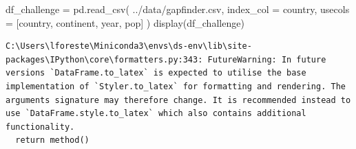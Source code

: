 \documentclass[
  letterpaper,
  DIV=11,
  numbers=noendperiod]{scrreprt}
\newenvironment{Shaded}{\begin{snugshade}}{\end{snugshade}}
\newcommand{\NormalTok}[1]{\textcolor[rgb]{0.00,0.23,0.31}{#1}}
\newcommand{\OperatorTok}[1]{\textcolor[rgb]{0.37,0.37,0.37}{#1}}
\newcommand{\StringTok}[1]{\textcolor[rgb]{0.13,0.47,0.30}{#1}}
\begin{document}
\begin{tcolorbox}[enhanced jigsaw, rightrule=.15mm, opacitybacktitle=0.6, colback=white, toprule=.15mm, colframe=quarto-callout-note-color-frame, bottomtitle=1mm, bottomrule=.15mm, arc=.35mm, coltitle=black, breakable, title={Solution to Challenge 1}, titlerule=0mm, opacityback=0, colbacktitle=quarto-callout-note-color!10!white, left=2mm, toptitle=1mm, leftrule=.75mm]

\begin{Shaded}
\begin{Highlighting}[]
\NormalTok{df\_challenge }\OperatorTok{=}\NormalTok{ pd.read\_csv(}
    \StringTok{\textquotesingle{}../data/gapfinder.csv\textquotesingle{}}\NormalTok{,}
\NormalTok{    index\_col }\OperatorTok{=} \StringTok{\textquotesingle{}country\textquotesingle{}}\NormalTok{,}
\NormalTok{    usecols }\OperatorTok{=}\NormalTok{ [}\StringTok{\textquotesingle{}country\textquotesingle{}}\NormalTok{, }\StringTok{\textquotesingle{}continent\textquotesingle{}}\NormalTok{, }\StringTok{\textquotesingle{}year\textquotesingle{}}\NormalTok{, }\StringTok{\textquotesingle{}pop\textquotesingle{}}\NormalTok{]}
\NormalTok{)}
\NormalTok{display(df\_challenge)}
\end{Highlighting}
\end{Shaded}

\begin{verbatim}
C:\Users\lforeste\Miniconda3\envs\ds-env\lib\site-packages\IPython\core\formatters.py:343: FutureWarning: In future versions `DataFrame.to_latex` is expected to utilise the base implementation of `Styler.to_latex` for formatting and rendering. The arguments signature may therefore change. It is recommended instead to use `DataFrame.style.to_latex` which also contains additional functionality.
  return method()
\end{verbatim}


\end{tcolorbox}
\end{document}
